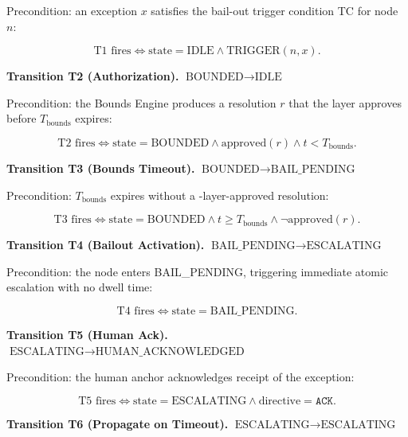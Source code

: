Precondition: an exception $x$ satisfies the bail-out trigger condition TC for node $n$:

\begin{equation}
\text{T1 fires} \iff \text{state} = \text{IDLE} \land \text{TRIGGER}(n, x). \tag{T1}
\end{equation}

\bigskip
\noindent\textbf{Transition T2 (Authorization).} $\text{BOUNDED} \rightarrow \text{IDLE}$

Precondition: the Bounds Engine produces a resolution $r$ that the \fact{} layer approves before $T_{\text{bounds}}$ expires:

\begin{equation}
\text{T2 fires} \iff \text{state} = \text{BOUNDED} \land \text{approved}(r) \land t < T_{\text{bounds}}. \tag{T2}
\end{equation}

\bigskip
\noindent\textbf{Transition T3 (Bounds Timeout).} $\text{BOUNDED} \rightarrow \text{BAIL\_PENDING}$

Precondition: $T_{\text{bounds}}$ expires without a \fact-layer-approved resolution:

\begin{equation}
\text{T3 fires} \iff \text{state} = \text{BOUNDED} \land t \geq T_{\text{bounds}} \land \neg\text{approved}(r). \tag{T3}
\end{equation}

\bigskip
\noindent\textbf{Transition T4 (Bailout Activation).} $\text{BAIL\_PENDING} \rightarrow \text{ESCALATING}$

Precondition: the node enters BAIL\_PENDING, triggering immediate atomic escalation with no dwell time:

\begin{equation}
\text{T4 fires} \iff \text{state} = \text{BAIL\_PENDING}. \tag{T4}
\end{equation}

\bigskip
\noindent\textbf{Transition T5 (Human Ack).} $\text{ESCALATING} \rightarrow \text{HUMAN\_ACKNOWLEDGED}$

Precondition: the human anchor acknowledges receipt of the exception:

\begin{equation}
\text{T5 fires} \iff \text{state} = \text{ESCALATING} \land \text{directive} = \texttt{ACK}. \tag{T5}
\end{equation}

\bigskip
\noindent\textbf{Transition T6 (Propagate on Timeout).} $\text{ESCALATING} \rightarrow \text{ESCALATING}$

